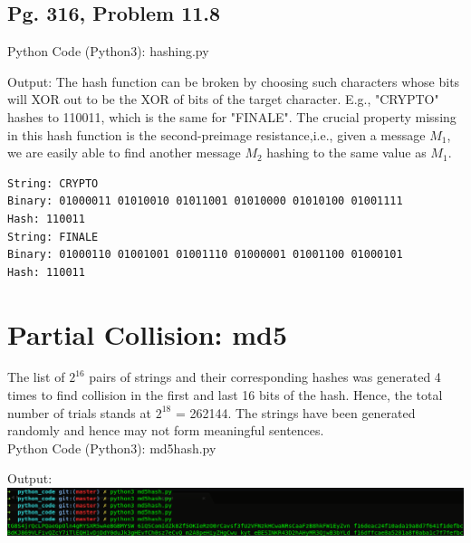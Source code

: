 \documentclass[12pt]{article}
\begin{document}
\begin{large}

\newpage
\subsection{Pg. 316, Problem 11.8}

Python Code (Python3): hashing.py

Output: The hash function can be broken by choosing such characters whose bits will XOR out to be the XOR of bits of the target character. E.g., "CRYPTO" hashes to 110011, which is the same for "FINALE". The crucial property missing in this hash function is the second-preimage resistance,i.e., given a message $M_1$, we are easily able to find another message $M_2$ hashing to the same value as $M_1$.
\begin{lstlisting}
String: CRYPTO
Binary: 01000011 01010010 01011001 01010000 01010100 01001111 
Hash: 110011
String: FINALE
Binary: 01000110 01001001 01001110 01000001 01001100 01000101 
Hash: 110011
\end{lstlisting}

\section{Partial Collision: md5}

The list of $2^{16}$ pairs of strings and their corresponding hashes was generated 4 times to find collision in the first and last 16 bits of the hash. Hence, the total number of trials stands at $2^{18}$ = 262144. The strings have been generated randomly and hence may not form meaningful sentences.\\
Python Code (Python3): md5hash.py

Output:\\
\includegraphics[width=\linewidth]{./images/img3.png}


\end{large}
\end{document}
